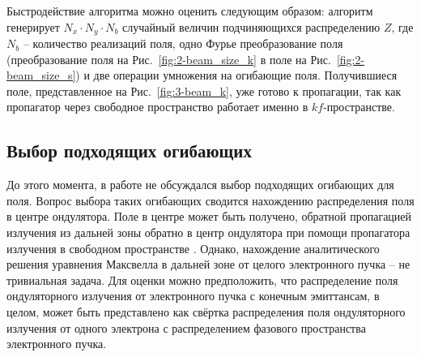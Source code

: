 Быстродействие алгоритма можно оценить следующим образом: алгоритм генерирует $N_x \cdot N_y \cdot N_b$ случайный величин подчиняющихся распределению $Z$, где $N_b$ -- количество реализаций поля, одно Фурье преобразование поля (преобразование поля на Рис.~\ref{fig:2-beam_size_k} в поле на Рис.~\ref{fig:2-beam_size_s}) и две операции умножения на огибающие поля. Получившиеся поле, представленное на Рис.~\ref{fig:3-beam_k}, уже готово к пропагации, так как пропагатор через свободное пространство работает именно в $kf$-пространстве.
\subsection{Выбор подходящих огибающих}
До этого момента, в работе не обсуждался выбор подходящих огибающих для поля. Вопрос выбора таких огибающих сводится нахождению распределения поля в центре ондулятора. Поле в центре может быть получено, обратной пропагацией излучения из дальней зоны обратно в центр ондулятора при помощи пропагатора излучения в свободном пространстве . Однако, нахождение аналитического решения уравнения Максвелла в дальней зоне от целого электронного пучка -- не тривиальная задача.  Для оценки можно предположить, что распределение поля ондуляторного излучения от электронного пучка с конечным эмиттансам, в целом, может быть представлено как свёртка распределения поля ондуляторного излучения от одного электрона с распределением фазового пространства электронного пучка.

